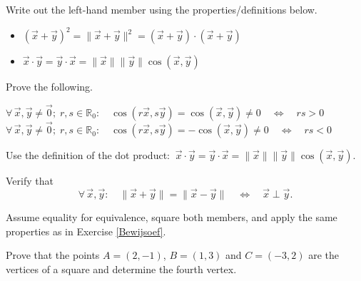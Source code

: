 \begin{Answer}\phantom{}
    Write out the left-hand member using the properties/definitions below. 
	\begin{itemize}
	    \item $(\vec{x}+\vec{y})^2 = \|\vec{x}+\vec{y}\|^2 = (\vec{x}+\vec{y}) \cdot (\vec{x}+\vec{y})$
	    \item $\vec x \cdot \vec y = \vec y \cdot \vec x = \|\vec x  \| \| \vec y \| \cos(\vec x, \vec y)$
	\end{itemize}
\end{Answer}

\begin{Exercise}[difficulty = 2] Prove the following.
	
		\Question $\forall\,\vec{x},\vec{y} \neq \vec{0}; \; r,s\in\mathbb{R}_0: \quad \cos(r\vec{x},s\vec{y})=\cos (\vec{x},\vec{y})\neq 0\quad\Leftrightarrow\quad rs >0$
		\Question $\forall\,\vec{x},\vec{y} \neq \vec{0}; \; r,s\in\mathbb{R}_0: \quad \cos(r\vec{x},s\vec{y})=-\cos (\vec{x},\vec{y})\neq 0\quad\Leftrightarrow\quad rs <0$

\end{Exercise}

\begin{Answer}\phantom{}
    Use the definition of the dot product: $\ \vec x \cdot \vec y = \vec y \cdot \vec x = \|\vec x  \| \| \vec y \| \cos(\vec x, \vec y)$.
\end{Answer}	

\begin{Exercise}[difficulty = 1] Verify that
	\[\forall\,  \vec{x},\vec{y}: \quad \| \vec{x}+\vec{y}\| = \| \vec{x}-\vec{y} \|
	\quad\Leftrightarrow\quad \vec{x} \perp \vec{y}.\]

\end{Exercise}

\begin{Answer}\phantom{}
    Assume equality for equivalence, square both members, and apply the same properties as in Exercise \ref{Bewijsoef}.
\end{Answer}
	
\fi
	
\begin{Exercise}[difficulty = 2] Prove that the points $A=(2,-1)$, $B=(1,3)$ and $C=(-3,2)$ are the vertices of a square and determine the fourth vertex.

\end{Exercise}

